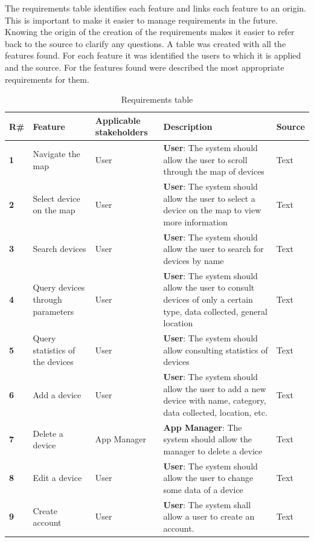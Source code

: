 \documentclass{scrreprt}
\begin{document}
The requirements table identifies each feature and links each feature to an origin.
\newline
This is important to make it easier to manage requirements in the future.
Knowing the origin of the creation of the requirements makes it easier to
refer back to the source to clarify any questions.
\newline
A table was created with all the features found. For each feature it was identified
the users to which it is applied and the source.
\newline
For the features found were described the most appropriate requirements for
them. \\
\begin{table}[H]
    \centering
    \begin{adjustbox}{width=1.2\textwidth,center=\textwidth}
    \begin{tabular}{|l|p{}|p{}|p{}|p{}|}
        \hline
        \rowcolor{green!20}
        \textbf{R\#} & \textbf{Feature} & \textbf{Applicable stakeholders} & \textbf{Description} & \textbf{Source} \\
        \hline
        \textbf{1} & Navigate the map & User & \textbf{User}: The system should allow the user to scroll through the map of devices & Text \\
        \hline
        \textbf{2} & Select device on the map & User & \textbf{User}: The system should allow the user to select a device on the map to view more information & Text \\
        \hline
        \textbf{3} & Search devices & User & \textbf{User}: The system should allow the user to search for devices by name & Text \\
        \hline
        \textbf{4} & Query devices through parameters & User & \textbf{User}: The system should allow the user to consult devices of only a certain type, data collected, general location & Text \\
        \hline
        \textbf{5} & Query statistics of the devices & User & \textbf{User}: The system should allow consulting statistics of devices & Text \\
        \hline
        \textbf{6} & Add a device & User & \textbf{User}: The system should allow the user to add a new device with name, category, data collected, location, etc. & Text \\
        \hline
        \textbf{7} & Delete a device & App Manager & \textbf{App Manager}: The system should allow the manager to delete a device & Text \\
        \hline
        \textbf{8} & Edit a device & User & \textbf{User}: The system should allow the user to change some data of a device & Text \\
        \hline
        \textbf{9} & Create account & User & \textbf{User}: The system shall allow a user to create an account. & Text \\
        \hline
    \end{tabular}
    \end{adjustbox}
    \caption{Requirements table}
    \label{table:table1}
\end{table}
\end{document}
